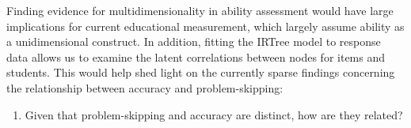 \documentclass[11pt]{article}
\begin{document}
Finding evidence for multidimensionality in ability assessment would have large implications for current educational measurement, which largely assume ability as a unidimensional construct. In addition, fitting the IRTree model to response data allows us to examine the latent correlations between nodes for items and students. This would help shed light on the currently sparse findings concerning the relationship between accuracy and problem-skipping: 

\begin{enumerate}
    \item[\textbf{RQ2:}] Given that problem-skipping and accuracy are distinct, how are they related? 
\end{enumerate}



\end{document}
